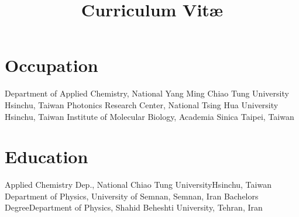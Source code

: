 \documentclass[11pt,a4paper]{moderncv}
\title{Curriculum Vit\ae}
\begin{document}
\makecvtitle
\vspace{-1.5cm}
\section{Occupation}
		{Department of Applied Chemistry, \newline National Yang Ming Chiao Tung University}
		{Hsinchu, Taiwan}{}{}
		{Photonics Research Center, \newline National Tsing Hua University}
		{Hsinchu, Taiwan}{}{}
		{Institute of Molecular Biology, \newline Academia Sinica}
		{Taipei, Taiwan}{}{}
\section{Education}
		{Applied Chemistry Dep., National Chiao
		Tung University}{Hsinchu, Taiwan}{}{}
		{Department of Physics, University of Semnan, Semnan, Iran}{}{}{}
		{Bachelors Degree}{Department of Physics, Shahid 
		Beheshti University, Tehran, Iran}{}{}{}
\end{document}
